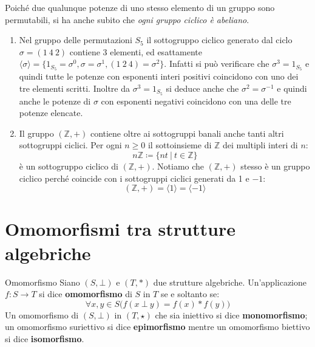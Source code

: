 \begin{osservation}
	Poiché due qualunque potenze di uno stesso elemento di un gruppo sono permutabili, si ha anche subito che \emph{ogni gruppo ciclico è abeliano}.
\end{osservation}

\begin{example}
\begin{enumerate}
	\item Nel gruppo delle permutazioni $S_{5}$ il sottogruppo ciclico generato dal ciclo $\sigma = (1 \ 4 \ 2)$ contiene 3 elementi, ed esattamente $\langle \sigma \rangle = \{1_{S_{5}}=\sigma^{0}, \sigma = \sigma^{1}, (1 \ 2 \ 4) = \sigma^{2}\}$. Infatti si può verificare che $\sigma^{3}= 1_{S_{5}}$ e quindi tutte le potenze con esponenti interi positivi coincidono con uno dei tre elementi scritti. Inoltre da $\sigma^{3}= 1_{S_{5}}$ si deduce anche che $\sigma^{2}= \sigma^{-1}$ e quindi anche le potenze di $\sigma$ con esponenti negativi coincidono con una delle tre potenze elencate.

	\item Il gruppo $(\mathbb{Z}, +)$ contiene oltre ai sottogruppi banali anche tanti altri sottogruppi ciclici. Per ogni $n \geq 0$ il sottoinsieme di $\mathbb{Z}$ dei multipli interi di $n$:
	\begin{displaymath}
		n \mathbb{Z} \coloneqq \{nt \ | \ t \in \mathbb{Z}\}
	\end{displaymath}
	è un sottogruppo ciclico di $(\mathbb{Z},+)$. Notiamo che $(\mathbb{Z},+)$ stesso è un gruppo ciclico perché coincide con i sottogruppi ciclici generati da 1 e $-1$:
	\begin{displaymath}
		(\mathbb{Z},+)=\langle 1 \rangle = \langle -1 \rangle
	\end{displaymath}
\end{enumerate}
\end{example}

\section{Omomorfismi tra strutture algebriche}\label{sez:omomorfismi}
\begin{defbox}{Omomorfismo}
	Siano $(S,\bot)$ e $(T, \ast)$ due strutture algebriche. Un'applicazione $f: S \longrightarrow T  $ si dice \textbf{omomorfismo} di $S$ in $T$ se e soltanto se:
	\begin{equation}
		\forall x,y \in S \bigl(f(x \ \bot \ y) = f(x) \ast f(y)\bigr)
	\end{equation}
	Un omomorfismo di $(S,\bot)$ in $(T,\star)$ che sia iniettivo si dice \textbf{monomorfismo}; un omomorfismo suriettivo  si dice  \textbf{epimorfismo} mentre un omomorfismo biettivo si dice  \textbf{isomorfismo}.
\end{defbox}

